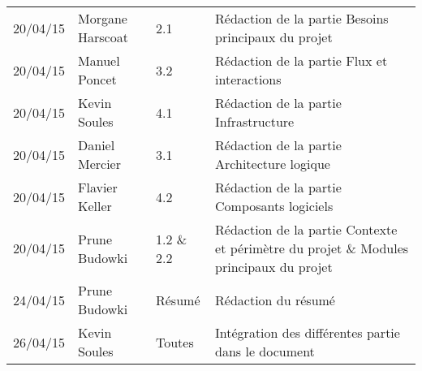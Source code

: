\small
\begin{tabular}{|p{1.7cm}| >{\raggedright}p{2.6cm}| >{\raggedright}p{3.2cm}|p{7.7cm}|}
  \hline
  \rowcolor{Gainsboro} \color{Navy}{\bfseries Date}  & \color{Navy}{\bfseries Auteur} & \color{Navy}{\bfseries Section(s)}  &\color{Navy}{\bfseries Commentaires} \\
  \hline
  20/04/15 & Morgane Harscoat & 2.1 & Rédaction de la partie Besoins principaux du projet\\
  \hline
  20/04/15 & Manuel Poncet & 3.2 & Rédaction de la partie Flux et interactions \\
  \hline
  20/04/15 & Kevin Soules & 4.1 & Rédaction de la partie Infrastructure\\
  \hline
  20/04/15 & Daniel Mercier & 3.1 & Rédaction de la partie Architecture logique\\
  \hline
  20/04/15 & Flavier Keller & 4.2 & Rédaction de la partie Composants logiciels \\
  \hline
  20/04/15 & Prune Budowki & 1.2 \& 2.2 & Rédaction de la partie Contexte et périmètre du projet \& Modules principaux du projet\\
  \hline
  24/04/15 & Prune Budowki & Résumé & Rédaction du résumé\\
  \hline
  26/04/15 & Kevin Soules & Toutes & Intégration des différentes partie dans le document\\
  \hline
\end{tabular}
\normalsize
